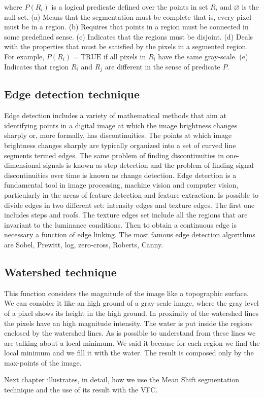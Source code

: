where $P(R_{{i}})$ is a logical predicate defined over the points in set $R_{i}$ and $\varnothing$  is the null set.
(a) Means that the segmentation must be complete that is, every pixel must be in a region.
(b) Requires that points in a region must be connected in some predefined sense.
(c) Indicates that the regions must be disjoint.
(d) Deals with the properties that must be satisfied by the pixels in a segmented region. For example, $P(R_{{i}})={\text{TRUE}}$ if all pixels in $R_{i}$ have the same gray-scale.
(e) Indicates that region $R_{i}$ and $R_{{j}}$ are different in the sense of predicate $P$.\cite{website:region_g}

\subsection{Edge detection technique}
Edge detection includes a variety of mathematical methods that aim at identifying points in a digital image at which the image brightness changes sharply or, more formally, has discontinuities. The points at which image brightness changes sharply are typically organized into a set of curved line segments termed edges. The same problem of finding discontinuities in one-dimensional signals is known as step detection and the problem of finding signal discontinuities over time is known as change detection. Edge detection is a fundamental tool in image processing, machine vision and computer vision, particularly in the areas of feature detection and feature extraction.\cite{edge} Is possible to divide edges in two different set: intensity edges and texture edges. The first one includes steps and roofs. The texture edges set include all the regions that are invariant to the luminance conditions. Then to obtain a continuous edge is necessary a function of edge linking. The most famous edge detection algorithms are Sobel, Prewitt, log, zero-cross, Roberts, Canny.

\subsection{Watershed technique}
This function considers the magnitude of the image like a topographic surface. We can consider it like an high ground of a gray-scale image, where the gray level of a pixel shows its height in the high ground. In proximity of the watershed lines the pixels have an high magnitude intensity. The water is put inside the regions enclosed by the watershed lines. As is possible to understand from these lines we are talking about a local minimum. We said it because for each region we find the local minimum and we fill it with the water. The result is composed only by the max-points of the image.

\bigskip

Next chapter illustrates, in detail, how we use the Mean Shift segmentation technique and the use of its result with the VFC.
